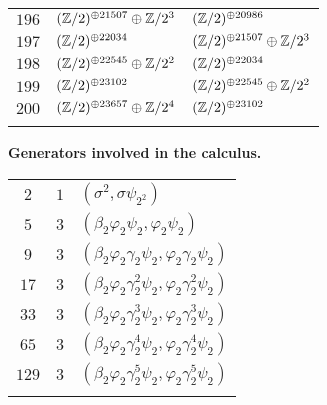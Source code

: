\begin{supertabular}{|c|p{5.5cm}|p{5.5cm}|}
$196$%
&$(\mathbb{Z}/2)^{\oplus21507}\oplus\mathbb{Z}/2^{3}$%
&$(\mathbb{Z}/2)^{\oplus20986}$\\

$197$%
&$(\mathbb{Z}/2)^{\oplus22034}$%
&$(\mathbb{Z}/2)^{\oplus21507}\oplus\mathbb{Z}/2^{3}$\\

$198$%
&$(\mathbb{Z}/2)^{\oplus22545}\oplus\mathbb{Z}/2^{2}$%
&$(\mathbb{Z}/2)^{\oplus22034}$\\

$199$%
&$(\mathbb{Z}/2)^{\oplus23102}$%
&$(\mathbb{Z}/2)^{\oplus22545}\oplus\mathbb{Z}/2^{2}$\\

$200$%
&$(\mathbb{Z}/2)^{\oplus23657}\oplus\mathbb{Z}/2^{4}$%
&$(\mathbb{Z}/2)^{\oplus23102}$\\

&&\\\end{supertabular}
\newpage
{\bf Generators involved in the calculus.\\}

\tablelasttail{\hline}
\begin{supertabular}{|c|c|p{9cm}|}
$2$
&$1$ &$(\sigma^{2},\sigma\psi_{2^{2}})$\\
$5$
&$3$ &$(\beta_2\varphi_2\psi_2,\varphi_2\psi_2)$\\
$9$
&$3$ &$(\beta_2\varphi_2\gamma_2\psi_2,\varphi_2\gamma_2\psi_2)$\\
$17$
&$3$ &$(\beta_2\varphi_2\gamma_2^{2}\psi_2,\varphi_2\gamma_2^{2}\psi_2)$\\
$33$
&$3$ &$(\beta_2\varphi_2\gamma_2^{3}\psi_2,\varphi_2\gamma_2^{3}\psi_2)$\\
$65$
&$3$ &$(\beta_2\varphi_2\gamma_2^{4}\psi_2,\varphi_2\gamma_2^{4}\psi_2)$\\
$129$
&$3$ &$(\beta_2\varphi_2\gamma_2^{5}\psi_2,\varphi_2\gamma_2^{5}\psi_2)$\\
&&\\\end{supertabular}
